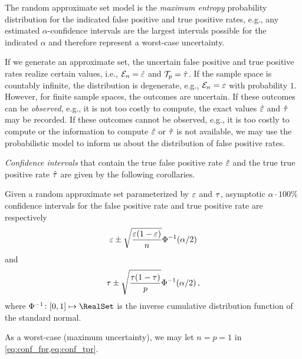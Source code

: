 \documentclass[10pt,final,hidelinks]{article}
\numberwithin{equation}{section}
\begin{document}
The random approximate set model is the \emph{maximum entropy} probability distribution for the indicated false positive and true positive rates, e.g., any estimated $\alpha$-confidence intervals are the largest intervals possible for the indicated $\alpha$ and therefore represent a worst-case uncertainty.

If we generate an approximate set, the uncertain false positive and true positive rates realize certain values, i.e., $\mathcal{E}_n = \hat{\varepsilon}$ and $\mathcal{T}_p = \hat{\tau}$.
If the sample space is countably infinite, the distribution is degenerate, e.g., $\mathcal{E}_n = \varepsilon$ with probability $1$. 
However, for finite sample spaces, the outcomes are uncertain.
If these outcomes can be \emph{observed}, e.g., it is not too costly to compute, the exact values $\hat{\varepsilon}$ and $\hat{\tau}$ may be recorded.
If these outcomes cannot be observed, e.g., it is too costly to compute or the information to compute $\hat{\varepsilon}$ or $\hat{\tau}$ is not available, we may use the probabilistic model to inform us about the distribution of false positive rates.

\emph{Confidence intervals} that contain the true false positive rate $\hat{\varepsilon}$ and the true true positive rate $\hat{\tau}$ are given by the following corollaries.
\begin{theorem}
    Given a random approximate set parameterized by $\varepsilon$ and $\tau$, asymptotic $\alpha \cdot 100\%$ confidence intervals for the false positive rate and true positive rate are respectively
    \begin{equation}
    \label{eq:conf_fpr}
    \varepsilon \pm \sqrt{\frac{\varepsilon(1-\varepsilon)}{n}} \Phi^{-1}(\alpha/2)
    \end{equation}
    and
    \begin{equation}
    \label{eq:conf_tpr}
    \tau \pm \sqrt{\frac{\tau(1-\tau)}{p}} \Phi^{-1}(\alpha/2)\,,
    \end{equation}
    where $\Phi^{-1} \colon [0,1] \mapsto \RealSet$ is the inverse cumulative distribution function of the standard normal.
\end{theorem}
As a worst-case (maximum uncertainty), we may let $n = p = 1$ in \cref{eq:conf_fpr,eq:conf_tpr}.
\end{document}
